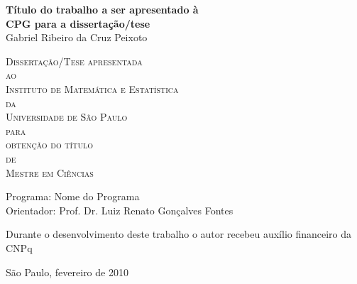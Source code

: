 \documentclass[11pt,twoside,a4paper]{book}
\begin{document}
\frontmatter 
\fancyhead[RO]{{\footnotesize\rightmark}\hspace{2em}\thepage}
\setcounter{tocdepth}{2}
\fancyhead[LE]{\thepage\hspace{2em}\footnotesize{\leftmark}}
\fancyhead[RE,LO]{}
\fancyhead[RO]{{\footnotesize\rightmark}\hspace{2em}\thepage}

\onehalfspacing  %

\thispagestyle{empty}
\begin{center}
    \vspace*{2.3cm}
    \textbf{\Large{Título do trabalho a ser apresentado à \\
    CPG para a dissertação/tese}}\\
    
    \vspace*{1.2cm}
    \Large{Gabriel Ribeiro da Cruz Peixoto}
    
    \vskip 2cm
    \textsc{
    Dissertação/Tese apresentada\\[-0.25cm] 
    ao\\[-0.25cm]
    Instituto de Matemática e Estatística\\[-0.25cm]
    da\\[-0.25cm]
    Universidade de São Paulo\\[-0.25cm]
    para\\[-0.25cm]
    obtenção do título\\[-0.25cm]
    de\\[-0.25cm]
    Mestre em Ciências}
    
    \vskip 1.5cm
    Programa: Nome do Programa\\
    Orientador: Prof. Dr. Luiz Renato Gonçalves Fontes

   	\vskip 1cm
    \normalsize{Durante o desenvolvimento deste trabalho o autor recebeu auxílio
    financeiro da CNPq}
    
    \vskip 0.5cm
    \normalsize{São Paulo, fevereiro de 2010}
\end{center}

\end{document}
